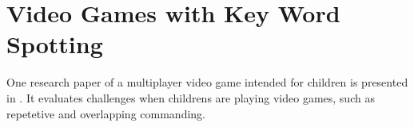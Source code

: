 
\section{Video Games with Key Word Spotting}\label{sec:prev_kws_games}
\thesisStateNotReady
One research paper of a multiplayer video game intended for children is presented in \cite{Harshavardhan2015}.
It evaluates challenges when childrens are playing video games, such as repetetive and overlapping commanding.
